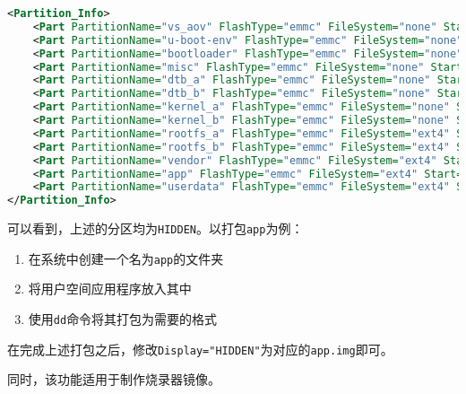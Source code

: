 \documentclass[UTF8]{ctexart}
\newcommand{\code}[1]{\colorbox{gray!10}{\lstinline[style=inlinecode]|#1|}}
\begin{document}
\begin{lstlisting}[language=xml]
<Partition_Info>
	<Part PartitionName="vs_aov" FlashType="emmc" FileSystem="none" Start="0M" Length="512K" SelectFile=".\vs_aov.bin"/>
	<Part PartitionName="u-boot-env" FlashType="emmc" FileSystem="none" Start="512K" Length="512K" Display="HIDDEN"/>
	<Part PartitionName="bootloader" FlashType="emmc" FileSystem="none" Start="1M" Length="7M" SelectFile=".\nsec_package.bin"/>
	<Part PartitionName="misc" FlashType="emmc" FileSystem="none" Start="8M" Length="1M" SelectFile=".\misc_init.bin"/>
	<Part PartitionName="dtb_a" FlashType="emmc" FileSystem="none" Start="9M" Length="2M" SelectFile=".\vs8x9-ci03.dtb"/>
	<Part PartitionName="dtb_b" FlashType="emmc" FileSystem="none" Start="11M" Length="2M" SelectFile=".\vs8x9-ci03.dtb"/>
	<Part PartitionName="kernel_a" FlashType="emmc" FileSystem="none" Start="13M" Length="20M" SelectFile=".\Image"/>
	<Part PartitionName="kernel_b" FlashType="emmc" FileSystem="none" Start="33M" Length="20M" SelectFile=".\Image"/>
	<Part PartitionName="rootfs_a" FlashType="emmc" FileSystem="ext4" Start="53M" Length="512M" SelectFile=".\rootfs_ext4.simg"/>
	<Part PartitionName="rootfs_b" FlashType="emmc" FileSystem="ext4" Start="565M" Length="512M" SelectFile=".\rootfs_ext4.simg"/>
	<Part PartitionName="vendor" FlashType="emmc" FileSystem="ext4" Start="1077M" Length="32M" Display="HIDDEN"/>
	<Part PartitionName="app" FlashType="emmc" FileSystem="ext4" Start="1109M" Length="256M" Display="HIDDEN"/>
	<Part PartitionName="userdata" FlashType="emmc" FileSystem="ext4" Start="1365M" Length="0K" Display="HIDDEN"/>
</Partition_Info>
\end{lstlisting}
    
\noindent 可以看到，上述的分区均为\code{HIDDEN}。以打包\code{app}为例：

\begin{enumerate}
    \item 在系统中创建一个名为\code{app}的文件夹
    \item 将用户空间应用程序放入其中
    \item 使用\code{dd}命令将其打包为需要的格式
\end{enumerate}

在完成上述打包之后，修改\code{Display="HIDDEN"}为对应的\code{app.img}即可。

同时，该功能适用于制作烧录器镜像。

\end{document}
